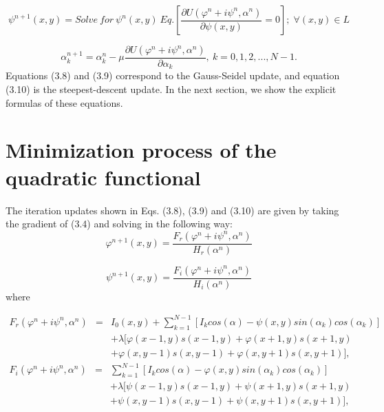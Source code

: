 \begin{equation}
\psi^{n+1}(x,y)=Solve\: for\:\psi^{n}(x,y)\: Eq.\left[\frac{\partial U(\varphi^{
n}+i\psi^{n},\alpha^{n})}{\partial\psi(x,y)}=0\right];\;\forall(x,y)\in L
\end{equation}


\begin{equation}
\alpha_{k}^{n+1}=\alpha_{k}^{n}-\mu\frac{\partial U(\varphi^{n}+i\psi^{n},
\alpha^{n})}{\partial\alpha_{k}},\: k=0,1,2,...,N-1.
\end{equation}
Equations (3.8) and (3.9) correspond to the Gauss-Seidel update, and equation
(3.10) is the steepest-descent update. In the next section, we show the explicit 
formulas of these equations.

\section{Minimization process of the quadratic functional}

The iteration updates shown in Eqs. (3.8), (3.9) and (3.10) are given by
taking the gradient of (3.4) and solving in the following way:
\begin{equation}
\varphi^{n+1}(x,y)=\frac{F_{r}(\varphi^{n}+i\psi^{n},\alpha^{n})}{H_{r}(\alpha^{
n})}
\end{equation}


\begin{equation}
\psi^{n+1}(x,y)=\frac{F_{i}(\varphi^{n}+i\psi^{n},\alpha^{n})}{H_{i}(\alpha^{n})
}
\end{equation}
where

\begin{eqnarray}
F_{r}(\varphi^{n}+i\psi^{n},\alpha^{n}) & = & I_{0}(x,y)+\sum_{k=1}^{N-1}[I_{k}
cos(\alpha)-\psi(x,y)sin(\alpha_{k})cos(\alpha_{k})]\nonumber \\
 &  & +\lambda[\varphi(x-1,y)s(x-1,y)+\varphi(x+1,y)s(x+1,y)\\
 &  & +\varphi(x,y-1)s(x,y-1)+\varphi(x,y+1)s(x,y+1)],\nonumber 
\end{eqnarray}
\begin{eqnarray}
F_{i}(\varphi^{n}+i\psi^{n},\alpha^{n}) & = & \sum_{k=1}^{N-1}[I_{k}cos(\alpha)-
\varphi(x,y)sin(\alpha_{k})cos(\alpha_{k})]\nonumber \\
 &  & +\lambda[\psi(x-1,y)s(x-1,y)+\psi(x+1,y)s(x+1,y)\\
 &  & +\psi(x,y-1)s(x,y-1)+\psi(x,y+1)s(x,y+1)],\nonumber 
\end{eqnarray}


